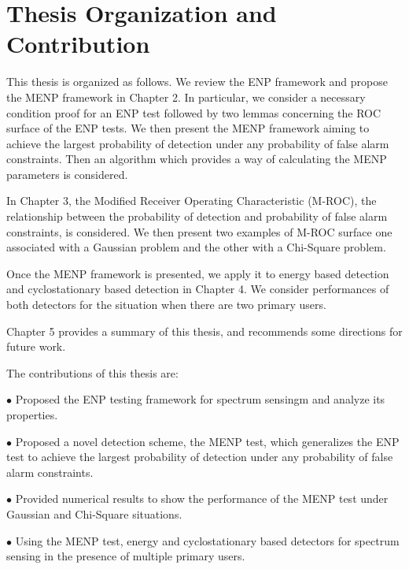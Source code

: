 \section{Thesis Organization and Contribution}
This thesis is organized as follows. We review the ENP framework and propose the MENP framework in Chapter 2. In particular,  we consider  a necessary condition proof for an  ENP test followed by  two lemmas concerning the ROC surface of the ENP tests. 
We then present the MENP framework aiming to  achieve the largest probability of detection  under any probability of false alarm constraints.
Then an algorithm which provides a way of calculating the MENP parameters is considered. 

In Chapter 3, the Modified Receiver Operating Characteristic (M-ROC), the relationship between the probability of detection and probability of false alarm constraints, is considered.  We then present two examples of M-ROC surface one associated with a Gaussian problem and the other with a Chi-Square problem. 

Once the MENP framework is presented, we apply it to energy based detection and cyclostationary based detection in Chapter 4. We consider  performances of both detectors for the situation when there are two primary users.  

Chapter 5 provides a summary of this thesis, and recommends some directions for future work.  

The contributions of this thesis are:

$\bullet$ Proposed the ENP testing framework for spectrum sensingm and analyze its properties.  

$\bullet$ Proposed a novel detection scheme,  the MENP test, which generalizes the ENP  test to  achieve the largest probability of detection under any probability of false alarm constraints. 

$\bullet$ Provided numerical results to show the performance of the MENP test under Gaussian and Chi-Square situations. 

$\bullet$ Using the MENP test, energy and cyclostationary based detectors for spectrum sensing in the presence of multiple primary users. 
